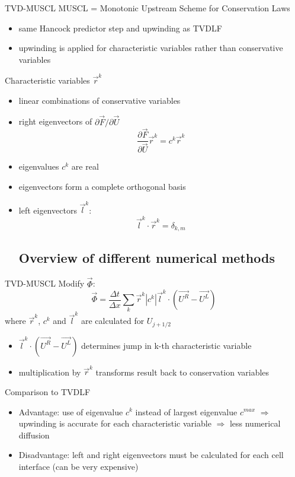 \begin{frame}{TVD-MUSCL}
MUSCL = Monotonic Upstream Scheme for Conservation Laws 
\begin{itemize}
	\item same Hancock predictor step and upwinding as TVDLF
	\item upwinding is applied for characteristic variables rather than conservative variables
\end{itemize}
Characteristic variables $\vec{r}^k$
\begin{itemize}
	\item linear combinations of conservative variables
	\item right eigenvectors of $\partial \vec{F} / \partial \vec{U}$
	\begin{equation*}
	\frac{\partial \vec{F}}{\partial \vec{U}} \vec{r}^k = c^k \vec{r}^k
	\end{equation*}
	\item eigenvalues $c^k$ are real
	\item eigenvectors form a complete orthogonal basis
	\item left eigenvectors $\vec{l}^k$:
	\begin{equation*}
	\vec{l}^k \cdot \vec{r}^k = \delta_{k,m}
	\end{equation*}
\subsection{Overview of different numerical methods}
\end{itemize}
\end{frame}

\begin{frame}{TVD-MUSCL}
	Modify $\vec{\Phi}$:
	\begin{equation*}
	\vec{\Phi} = \frac{\Delta t}{\Delta x} \sum_{k} \vec{r}^k | c^k | \vec{l}^k \cdot (\vec{U^R} - \vec{U^L})
	\end{equation*}
	where $\vec{r}^k$, $c^k$ and $\vec{l}^k$ are calculated for $U_{j+1/2}$
	\begin{itemize}
		\item $\vec{l}^k \cdot (\vec{U^R} - \vec{U^L})$ determines jump in k-th characteristic variable
		\item multiplication by $\vec{r}^k$ transforms result back to conservation variables
	\end{itemize}
	Comparison to TVDLF
	\begin{itemize}
		\item Advantage: use of eigenvalue $c^k$ instead of largest eigenvalue $c^{max}$ $\Rightarrow$ upwinding is accurate for each characteristic variable $\Rightarrow$ less numerical diffusion
		\item Disadvantage: left and right eigenvectors must be calculated for each cell interface (can be very expensive)
	\end{itemize}
\end{frame}



